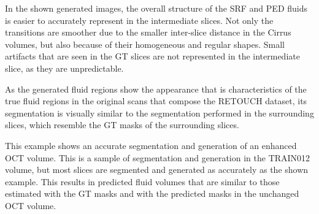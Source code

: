In the shown generated images, the overall structure of the SRF and PED fluids is easier to accurately represent in the intermediate slices. Not only the transitions are smoother due to the smaller inter-slice distance in the Cirrus volumes, but also because of their homogeneous and regular shapes. Small artifacts that are seen in the GT slices are not represented in the intermediate slice, as they are unpredictable.
\par
As the generated fluid regions show the appearance that is characteristics of the true fluid regions in the original scans that compose the RETOUCH dataset, its segmentation is visually similar to the segmentation performed in the surrounding slices, which resemble the GT masks of the surrounding slices. 
\par
This example shows an accurate segmentation and generation of an enhanced OCT volume. This is a sample of segmentation and generation in the TRAIN012 volume, but most slices are segmented and generated as accurately as the shown example. This results in predicted fluid volumes that are similar to those estimated with the GT masks and with the predicted masks in the unchanged OCT volume.